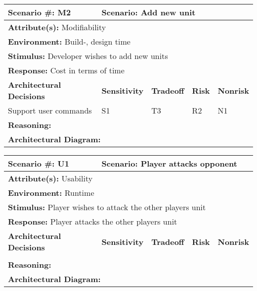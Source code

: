 \begin{tabular}{|m{}|m{}|m{}
|m{}|m{}|m{}|}
  \hline
  {\bf Scenario \#:} M2 & \multicolumn{5}{m{0.75 \textwidth}|}{{\bf Scenario:}
  Add new unit} \\ \hline
  \multicolumn{6}{|m{0.9 \textwidth}|}{{\bf Attribute(s):} Modifiability}
  \\ \hline
  \multicolumn{6}{|m{0.9 \textwidth}|}{{\bf Environment:} Build-, design time}
  \\ \hline
  \multicolumn{6}{|m{0.9 \textwidth}|}{{\bf Stimulus:} Developer wishes to add
  new units} \\ \hline
  \multicolumn{6}{|m{0.9 \textwidth}|}{{\bf Response:} Cost in terms of time}
  \\ \hline
  \multicolumn{2}{|m{0.3 \textwidth}|}{\bf Architectural Decisions} &
  {\bf Sensitivity} & {\bf Tradeoff} & {\bf Risk} & {\bf Nonrisk} \\ \hline
  \multicolumn{2}{|m{0.3 \textwidth}|}{Support user commands} & S1 & T3 & R2 &
  N1 \\ \hline
  \multicolumn{6}{|m{0.9 \textwidth}|}{{\bf Reasoning:} } \\ \hline
  \multicolumn{6}{|m{0.9 \textwidth}|}{{\bf Architectural Diagram:} } \\ \hline
\end{tabular}

\begin{tabular}{|m{}|m{}|m{}
|m{}|m{}|m{}|}
  \hline
  {\bf Scenario \#:} U1 & \multicolumn{5}{m{0.75 \textwidth}|}{{\bf Scenario:}
  Player attacks opponent} \\ \hline
  \multicolumn{6}{|m{0.9 \textwidth}|}{{\bf Attribute(s):} Usability} \\ \hline
  \multicolumn{6}{|m{0.9 \textwidth}|}{{\bf Environment:} Runtime} \\ \hline
  \multicolumn{6}{|m{0.9 \textwidth}|}{{\bf Stimulus:} Player wishes to attack
  the other players unit} \\ \hline
  \multicolumn{6}{|m{0.9 \textwidth}|}{{\bf Response:} Player attacks the other
  players unit} \\ \hline
  \multicolumn{2}{|m{0.3 \textwidth}|}{\bf Architectural Decisions} &
  {\bf Sensitivity} & {\bf Tradeoff} & {\bf Risk} & {\bf Nonrisk} \\ \hline
  \multicolumn{2}{|m{0.3 \textwidth}|}{} &  &  &  &  \\ \hline
  \multicolumn{6}{|m{0.9 \textwidth}|}{{\bf Reasoning:} } \\ \hline
  \multicolumn{6}{|m{0.9 \textwidth}|}{{\bf Architectural Diagram:} } \\ \hline
\end{tabular}

